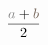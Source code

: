 \documentclass[preview]{standalone}
\begin{document}
\begin{align*}
\frac {\textcolor[HTML]{888888}{a}+\textcolor[HTML]{736357}{b}}{2}
\end{align*}
\end{document}
